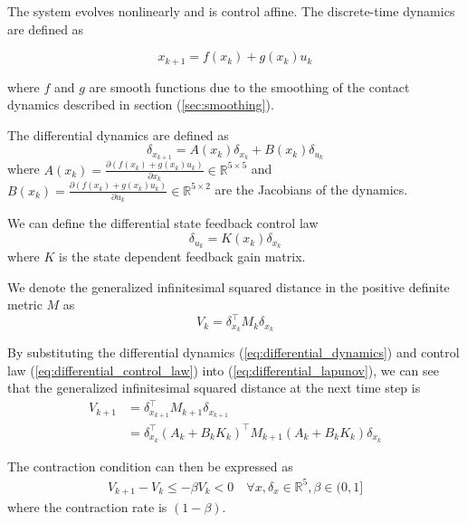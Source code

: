 \documentclass[journal]{IEEEtran}
\begin{document}
The system evolves nonlinearly and is control affine. The discrete-time dynamics are defined as

\begin{equation}
    x_{k+1} = f(x_k) + g(x_k)u_k
\end{equation}

where $f$ and $g$ are smooth functions due to the smoothing of the contact dynamics described in section (\ref{sec:smoothing}).

The differential dynamics are defined as
\begin{equation}
    \delta_{x_{k+1}} = A(x_k)\delta_{x_k} + B(x_k)\delta_{u_k}
	\label{eq:differential_dynamics}
\end{equation}
where $A(x_k) = \frac{\partial (f(x_k) + g(x_k)u_k)}{\partial x_k} \in \mathbb{R}^{5 \times 5}$ and $B(x_k) = \frac{\partial (f(x_k) + g(x_k)u_k)}{\partial u_k} \in \mathbb{R}^{5 \times 2}$ are the Jacobians of the dynamics.

We can define the differential state feedback control law
\begin{equation}
	\label{eq:differential_control_law}
    \delta_{u_k} = K(x_k)\delta_{x_k}
\end{equation}
where $K$ is the state dependent feedback gain matrix.

We denote the generalized infinitesimal squared distance in the positive definite metric $M$ as
\begin{equation}
    V_k = \delta^\top_{x_k} M_{k} \delta_{x_k}
	\label{eq:differential_lapunov}
\end{equation}

By substituting the differential dynamics (\ref{eq:differential_dynamics}) and control law (\ref{eq:differential_control_law}) into (\ref{eq:differential_lapunov}), we can see that the generalized infinitesimal squared distance at the next time step is
\begin{equation}
	\begin{aligned}
	V_{k+1} & = \delta^\top_{x_{k+1}} M_{k+1} \delta_{x_{k+1}} \\
	& = \delta^\top_{x_k} (A_k + B_k K_k)^\top M_{k+1} (A_k + B_k K_k)\delta_{x_k}
	\end{aligned}
\end{equation}

The contraction condition can then be expressed as
\begin{equation}
	\begin{aligned}
	V_{k+1} - V_k \leq 
	- \beta V_k <
	0 \quad \forall x, \delta_x \in \mathbb{R}^5, \beta \in (0,1]
	\end{aligned}
	\label{eq:lyapnov_contraction_condition}
\end{equation}
where the contraction rate is $(1-\beta)$.
\end{document}
